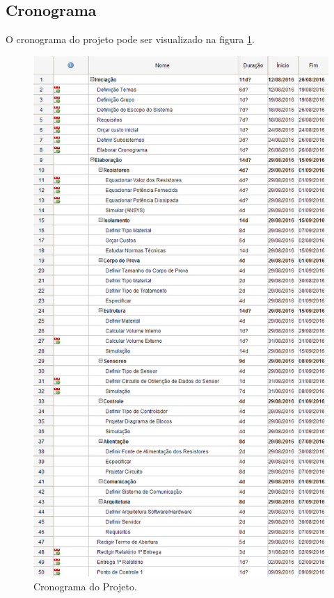 \subsection{Cronograma}

O cronograma do projeto pode ser visualizado na figura \ref{cronograma}.

\begin{figure}[!h]
	\centering
	\label{cronograma}
	\includegraphics[keepaspectratio=true,scale=0.6]{figuras/cronograma.jpg}
	\caption{Cronograma do Projeto.}
\end{figure}

